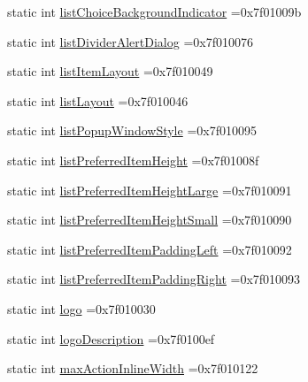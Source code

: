 \begin{DoxyCompactItemize}
static int \hyperlink{classandroid_1_1support_1_1v7_1_1recyclerview_1_1R_1_1attr_acf0b97792e32abd922cc12ee7fd21933}{list\+Choice\+Background\+Indicator} =0x7f01009b
\item 
static int \hyperlink{classandroid_1_1support_1_1v7_1_1recyclerview_1_1R_1_1attr_aa1c6e2f7ad33af1aa30ef5212aaf99e0}{list\+Divider\+Alert\+Dialog} =0x7f010076
\item 
static int \hyperlink{classandroid_1_1support_1_1v7_1_1recyclerview_1_1R_1_1attr_af48baca074ab26ace5ff3f4c708b839c}{list\+Item\+Layout} =0x7f010049
\item 
static int \hyperlink{classandroid_1_1support_1_1v7_1_1recyclerview_1_1R_1_1attr_a0f96df4d5ad81cb624cd152e87a94281}{list\+Layout} =0x7f010046
\item 
static int \hyperlink{classandroid_1_1support_1_1v7_1_1recyclerview_1_1R_1_1attr_ae5eeee2a9b29dee74be84c72c3d62f9e}{list\+Popup\+Window\+Style} =0x7f010095
\item 
static int \hyperlink{classandroid_1_1support_1_1v7_1_1recyclerview_1_1R_1_1attr_a197263355ceadf89a488e2fd799f74c5}{list\+Preferred\+Item\+Height} =0x7f01008f
\item 
static int \hyperlink{classandroid_1_1support_1_1v7_1_1recyclerview_1_1R_1_1attr_a651be73dd0c709da9b500cd15bde3f16}{list\+Preferred\+Item\+Height\+Large} =0x7f010091
\item 
static int \hyperlink{classandroid_1_1support_1_1v7_1_1recyclerview_1_1R_1_1attr_aab7ea89f4acd694a8ac4b8dae22a0ef5}{list\+Preferred\+Item\+Height\+Small} =0x7f010090
\item 
static int \hyperlink{classandroid_1_1support_1_1v7_1_1recyclerview_1_1R_1_1attr_acb9355683e3619774644f0460c0a1164}{list\+Preferred\+Item\+Padding\+Left} =0x7f010092
\item 
static int \hyperlink{classandroid_1_1support_1_1v7_1_1recyclerview_1_1R_1_1attr_ae59071f272b8d6740d54978c23f58a43}{list\+Preferred\+Item\+Padding\+Right} =0x7f010093
\item 
static int \hyperlink{classandroid_1_1support_1_1v7_1_1recyclerview_1_1R_1_1attr_a0e11a6194e5e18a254443c9b5d53e0e8}{logo} =0x7f010030
\item 
static int \hyperlink{classandroid_1_1support_1_1v7_1_1recyclerview_1_1R_1_1attr_a31993158f7fc9cc8411e83a3742fbccc}{logo\+Description} =0x7f0100ef
\item 
static int \hyperlink{classandroid_1_1support_1_1v7_1_1recyclerview_1_1R_1_1attr_a3a98399052a2eeecb97c4f3ae0463cae}{max\+Action\+Inline\+Width} =0x7f010122
\item 

\end{DoxyCompactItemize}
